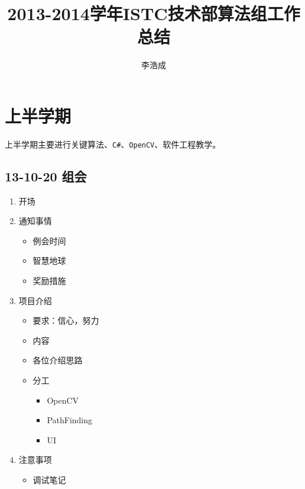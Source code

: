 \documentclass[]{report}
\title{2013-2014学年ISTC技术部算法组工作总结}
\author{李浩成}
\begin{document}
\maketitle

\begin{abstract}
\end{abstract}
\chapter{上半学期}
上半学期主要进行关键算法、\verb|C#|、\verb|OpenCV|、软件工程教学。
\section{13-10-20 组会}
\begin{enumerate}
	\item 开场
	\item 通知事情
	\begin{itemize}
		\item 例会时间
		\item 智慧地球
		\item 奖励措施
	\end{itemize}	
	\item 项目介绍
	\begin{itemize}
		\item 要求：信心，努力
		\item 内容
		\item 各位介绍思路
		\item 分工
		\begin{itemize}
			\item OpenCV
			\item PathFinding
			\item UI
		\end{itemize}
	\end{itemize}	
	\item 注意事项
	\begin{itemize}
		\item 调试笔记
	\end{itemize}
\end{enumerate}
\end{document}
